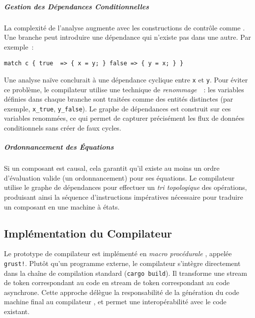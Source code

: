 \subparagraph{Gestion des Dépendances Conditionnelles} La complexité de l'analyse augmente avec les
constructions de contrôle comme . Une branche peut introduire une dépendance qui
n'existe pas dans une autre. Par exemple~:
\begin{lstlisting}[language=GRust, numbers=none]
match c { true  => { x = y; } false => { y = x; } }
\end{lstlisting}
Une analyse naïve conclurait à une dépendance cyclique entre \texttt{x} et \texttt{y}. Pour éviter
ce problème, le compilateur utilise une technique de \emph{renommage}~\cite{bourke:hal-03936656}~:
les variables définies dans chaque branche sont traitées comme des entités distinctes (par exemple,
\texttt{x\_true}, \texttt{y\_false}). Le graphe de dépendances est construit sur ces variables
renommées, ce qui permet de capturer précisément les flux de données conditionnels sans créer de
faux cycles.

\subparagraph{Ordonnancement des Équations} Si un composant est causal, cela garantit qu'il existe
au moins un ordre d'évaluation valide (un ordonnancement) pour ses équations. Le compilateur utilise
le graphe de dépendances pour effectuer un \emph{tri topologique} des opérations, produisant ainsi
la séquence d'instructions impératives nécessaire pour traduire un composant en une machine à états.

\subsection{Implémentation du Compilateur}

Le prototype de compilateur \GRust est implémenté en \emph{macro procédurale} \Rust, appelée
\texttt{grust!}. Plutôt qu'un programme externe, le compilateur s'intègre directement dans la chaîne
de compilation \Rust standard (\texttt{cargo build}). Il transforme une stream de token
correspondant au code \GRust en stream de token correspondant au code \Rust asynchrone. Cette
approche délègue la responsabilité de la génération du code machine final au compilateur \Rust, et
permet une interopérabilité avec le code \Rust existant.

